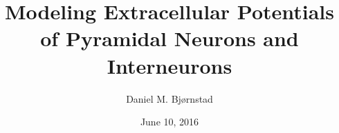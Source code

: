 \documentclass{beamer}
\title[Short title] %
{
    Modeling Extracellular Potentials of Pyramidal Neurons and Interneurons%
}
\author %
{Daniel M. Bj\o rnstad}
\date{June 10, 2016}
\institute
{
    Master Thesis Summary
}
\begin{document}
\begin{frame}
  \titlepage
\end{frame}






%   
%   
%
\end{document}
